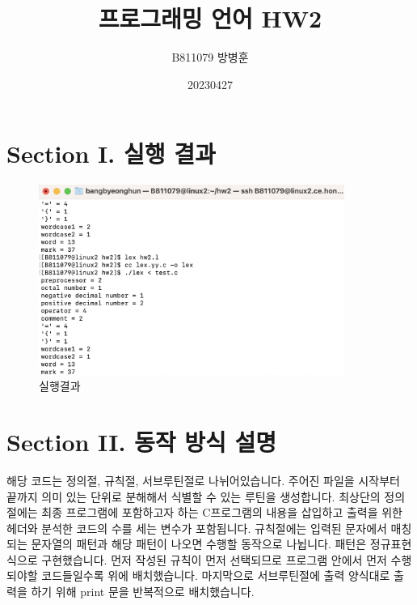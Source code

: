 \documentclass{article}
\title{프로그래밍 언어 HW2}
\author{B811079 방병훈}
\date{20230427}
\begin{document}
\maketitle
\section{Section I. 실행 결과}
\begin{figure}[h]
    \centering
    \includegraphics[width = 10cm]{run.png}
    \caption{실행결과}
    \label{fig:fig1}
\end{figure}
\section{Section II. 동작 방식 설명}
해당 코드는 정의절, 규칙절, 서브루틴절로 나뉘어있습니다. 주어진 파일을 시작부터 끝까지 의미 있는 단위로 분해해서 식별할 수 있는 루틴을 생성합니다. 최상단의 정의절에는 최종 프로그램에 포함하고자 하는 C프로그램의 내용을 삽입하고 출력을 위한 헤더와 분석한 코드의 수를 세는 변수가 포함됩니다.
규칙절에는 입력된 문자에서 매칭되는 문자열의 패턴과 해당 패턴이 나오면 수행할 동작으로 나뉩니다. 패턴은 정규표현식으로 구현했습니다. 먼저 작성된 규칙이 먼저 선택되므로 프로그램 안에서 먼저 수행되야할 코드들일수록 위에 배치했습니다. 마지막으로 서브루틴절에 출력 양식대로 출력을 하기 위해 print 문을 반복적으로 배치했습니다.
\end{document}
